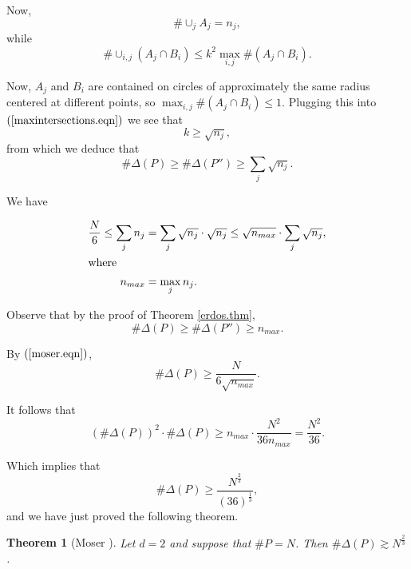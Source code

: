 \documentclass[]{amsart}
\numberwithin{equation}{section}
\theoremstyle{plain}
\newtheorem{theorem}{Theorem}[section]
\theoremstyle{definition}
\theoremstyle{remark}
\begin{document}
Now,
\begin{equation}
\#  \cup_j A_j=n_j,
\end{equation}
 while
\begin{equation} \label{maxintersections.eqn}
\# \cup_{i,j} \left( A_j \cap B_i \right) \leq k^2 \max_{i,j} \# \left( A_j \cap B_i \right).
\end{equation}


Now, $A_j$ and $B_i$ are contained on circles of approximately the
same radius centered at different points, so $\max_{i,j} \# (A_j
\cap B_i) \leq 1$. Plugging this into $(\ref{maxintersections.eqn})$ we see that
\begin{equation}
k \ge \sqrt{n_j},
\end{equation}
 from which we deduce that
\begin{equation} \label{moser.eqn}
\# \Delta(P) \ge \# \Delta(P'') \ge \sum_j \sqrt{n_j}.
\end{equation}


We have

\begin{align}
\frac{N}{6} \leq \sum_j n_j&=\sum_j \sqrt{n_j} \cdot
\sqrt{n_j} \leq \sqrt{n_{max}} \cdot \sum_j \sqrt{n_j}, \\
\intertext{where}
n_{max}&=\max_j n_j.
\end{align}


Observe that by the proof of Theorem \ref{erdos.thm},
\begin{equation}
 \# \Delta(P) \ge \# \Delta(P'') \ge n_{max}.
\end{equation}


By $(\ref{moser.eqn})$,
\begin{equation}
\# \Delta(P) \ge \frac{N}{6 \sqrt{n_{max}}}.
\end{equation}

It follows that
\begin{equation}
{(\# \Delta(P))}^2 \cdot \# \Delta(P) \ge
n_{max} \cdot \frac{N^2}{36 n_{max}}=\frac{N^2}{36}.
\end{equation}



Which implies that
\begin{equation}
\# \Delta(P) \ge
\frac{N^{\frac{2}{3}}}{{(36)}^{\frac{1}{3}}},
\end{equation}
and we
have just proved the following theorem.

\begin{theorem}[Moser \cite{Mos}]  \label{moser.thm}
Let $d=2$ and suppose that $\# P=N$. Then $\# \Delta(P) \gtrsim N^{\frac{2}{3}}$.

 \end{theorem}
\end{document}
